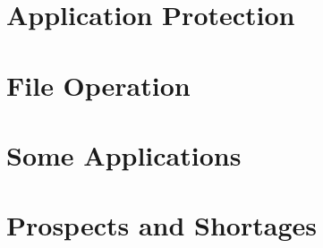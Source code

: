 \documentclass{swfcthesisp}
\begin{document}
\section{Application Protection}

\section{File Operation}

\section{Some Applications}

\section{Prospects and Shortages}


\Appendix{}
\printbibliography[heading={bibintoc},title={参考文献}] %
\advisorinfopage{}                 %
\acknowledgmentspage{}             %






\end{document}
